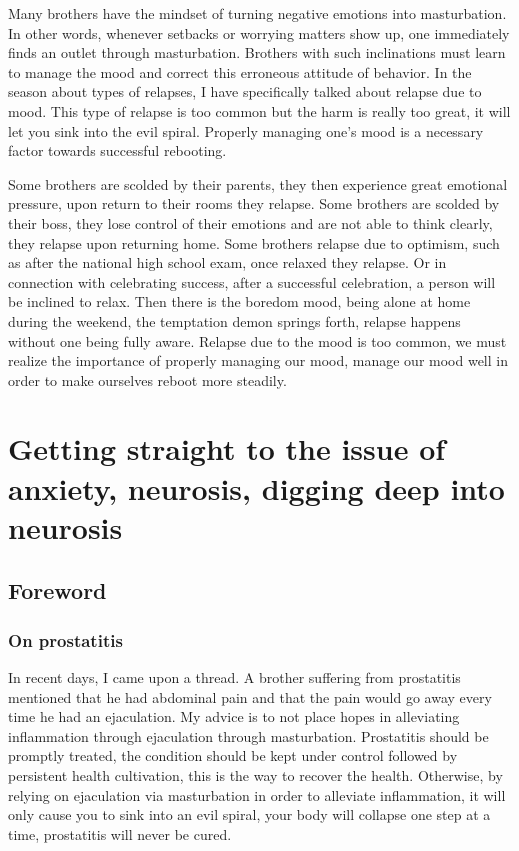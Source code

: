 \documentclass[
]{book}
\begin{document}
Many brothers have the mindset of turning negative emotions into masturbation. In other words, whenever setbacks or worrying matters show up, one immediately finds an outlet through masturbation. Brothers with such inclinations must learn to manage the mood and correct this erroneous attitude of behavior. In the season about types of relapses, I have specifically talked about relapse due to mood. This type of relapse is too common but the harm is really too great, it will let you sink into the evil spiral. Properly managing one's mood is a necessary factor towards successful rebooting.

Some brothers are scolded by their parents, they then experience great emotional pressure, upon return to their rooms they relapse. Some brothers are scolded by their boss, they lose control of their emotions and are not able to think clearly, they relapse upon returning home. Some brothers relapse due to optimism, such as after the national high school exam, once relaxed they relapse. Or in connection with celebrating success, after a successful celebration, a person will be inclined to relax. Then there is the boredom mood, being alone at home during the weekend, the temptation demon springs forth, relapse happens without one being fully aware. Relapse due to the mood is too common, we must realize the importance of properly managing our mood, manage our mood well in order to make ourselves reboot more steadily.

\hypertarget{getting-straight-to-the-issue-of-anxiety-neurosis-digging-deep-into-neurosis}{%
\chapter{Getting straight to the issue of anxiety, neurosis, digging deep into neurosis}\label{getting-straight-to-the-issue-of-anxiety-neurosis-digging-deep-into-neurosis}}

\hypertarget{foreword-8}{%
\section{Foreword}\label{foreword-8}}

\hypertarget{on-prostatitis}{%
\subsection{On prostatitis}\label{on-prostatitis}}

In recent days, I came upon a thread. A brother suffering from prostatitis mentioned that he had abdominal pain and that the pain would go away every time he had an ejaculation. My advice is to not place hopes in alleviating inflammation through ejaculation through masturbation. Prostatitis should be promptly treated, the condition should be kept under control followed by persistent health cultivation, this is the way to recover the health. Otherwise, by relying on ejaculation via masturbation in order to alleviate inflammation, it will only cause you to sink into an evil spiral, your body will collapse one step at a time, prostatitis will never be cured.
\end{document}

